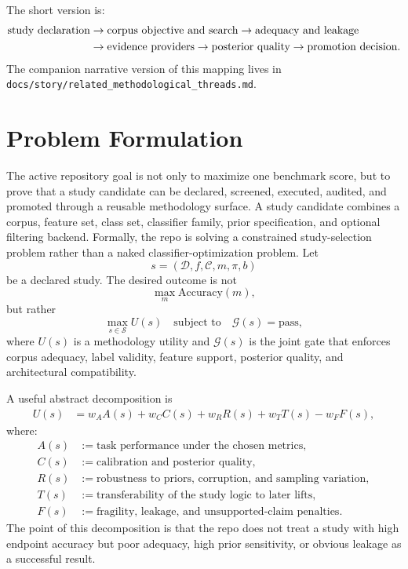 \documentclass[11pt]{article}
\newcommand{\codepath}[1]{\nolinkurl{#1}}
\begin{document}
The short version is:
\begin{align}
\text{study declaration}
&\rightarrow
\text{corpus objective and search}
\rightarrow
\text{adequacy and leakage}
\notag \\
&\rightarrow
\text{evidence providers}
\rightarrow
\text{posterior quality}
\rightarrow
\text{promotion decision}.
\end{align}
The companion narrative version of this mapping lives in
\codepath{docs/story/related_methodological_threads.md}.

\section{Problem Formulation}
The active repository goal is not only to maximize one benchmark score, but to prove that a study candidate can be declared, screened, executed, audited, and promoted through a reusable methodology surface. A study candidate combines a corpus, feature set, class set, classifier family, prior specification, and optional filtering backend.
Formally, the repo is solving a constrained study-selection problem rather than
a naked classifier-optimization problem. Let
\begin{equation}
s = (\mathcal{D}, f, \mathcal{C}, m, \pi, b)
\end{equation}
be a declared study. The desired outcome is not
\begin{equation}
\max_m \mathrm{Accuracy}(m),
\end{equation}
but rather
\begin{equation}
\max_{s \in \mathcal{S}}
U(s)
\quad
\text{subject to}
\quad
\mathcal{G}(s)=\mathrm{pass},
\end{equation}
where \(U(s)\) is a methodology utility and \(\mathcal{G}(s)\) is the joint
gate that enforces corpus adequacy, label validity, feature support, posterior
quality, and architectural compatibility.

A useful abstract decomposition is
\begin{align}
U(s)
&=
w_A A(s)
+ w_C C(s)
+ w_R R(s)
+ w_T T(s)
- w_F F(s),
\end{align}
where:
\begin{align}
A(s) &:= \text{task performance under the chosen metrics}, \\
C(s) &:= \text{calibration and posterior quality}, \\
R(s) &:= \text{robustness to priors, corruption, and sampling variation}, \\
T(s) &:= \text{transferability of the study logic to later lifts}, \\
F(s) &:= \text{fragility, leakage, and unsupported-claim penalties}.
\end{align}
The point of this decomposition is that the repo does not treat a study with
high endpoint accuracy but poor adequacy, high prior sensitivity, or obvious
leakage as a successful result.
\end{document}
